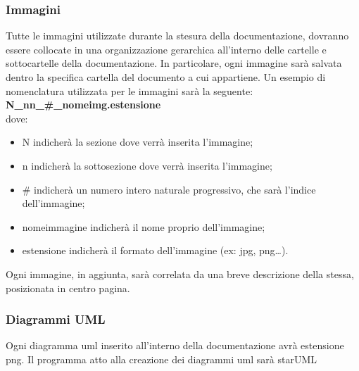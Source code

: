 \subsubsection{Immagini}
Tutte le immagini utilizzate durante la stesura della documentazione, dovranno essere collocate in una organizzazione gerarchica all’interno delle cartelle e sottocartelle della documentazione. In particolare, ogni immagine sarà salvata dentro la specifica cartella del documento a cui appartiene. Un esempio di nomenclatura utilizzata per le immagini sarà la seguente:
\textbf{N\_nn\_\#\_nomeimg.estensione}\\
dove:
\begin{itemize}
	\item N indicherà la sezione dove verrà inserita l’immagine;
	\item n indicherà la sottosezione dove verrà inserita l’immagine;
	\item # indicherà un numero intero naturale progressivo, che sarà l’indice dell’immagine;
	\item nomeimmagine indicherà il nome proprio dell’immagine;
	\item estensione indicherà il formato dell’immagine (ex: jpg, png…).
\end{itemize}
Ogni immagine, in aggiunta, sarà correlata da una breve descrizione della stessa, posizionata in centro pagina.

\subsubsection{Diagrammi UML}
Ogni diagramma uml inserito all’interno della documentazione avrà estensione png. Il programma atto alla creazione dei diagrammi uml sarà starUML





